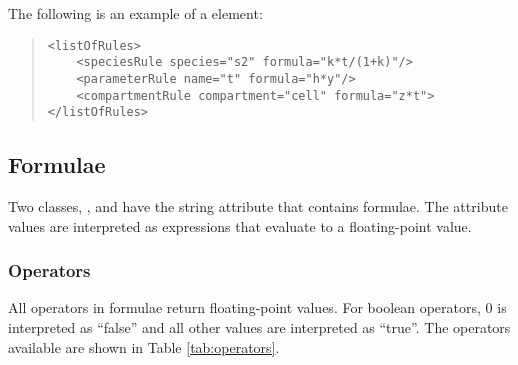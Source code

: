 \documentclass[10pt]{cek-article}
\begin{document}
The following is an example of a
 element:
\begin{quote}
  \begin{small}
    \tightspacing
\begin{verbatim}
<listOfRules>
    <speciesRule species="s2" formula="k*t/(1+k)"/>
    <parameterRule name="t" formula="h*y"/>
    <compartmentRule compartment="cell" formula="z*t">
</listOfRules>
\end{verbatim}
    \regularspacing
  \end{small}
\end{quote}

\subsection{Formulae}

Two classes, , and  have the string attribute
 that contains formulae.
The attribute values are interpreted as expressions that evaluate to a
floating-point value.

\subsubsection{Operators}

All operators in formulae return floating-point values.  For boolean
operators, 0 is interpreted as ``false'' and all other values are
interpreted as ``true''.  The operators available are
shown in Table \ref{tab:operators}.
\end{document}

